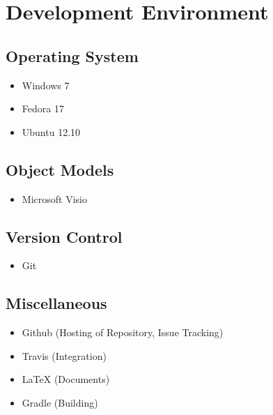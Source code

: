 \section{Development Environment}

\subsection*{Operating System}
\begin{itemize}
\item Windows 7
\item Fedora 17
\item Ubuntu 12.10
\end{itemize}
\subsection*{Object Models}
\begin{itemize}
\item Microsoft Visio
\end{itemize}
\subsection*{Version Control}
\begin{itemize}
\item Git
\end{itemize}
\subsection*{Miscellaneous}
\begin{itemize}
\item Github (Hosting of Repository, Issue Tracking)
\item Travis (Integration)
\item {\LaTeX} (Documents)
\item Gradle (Building) 
\end{itemize}